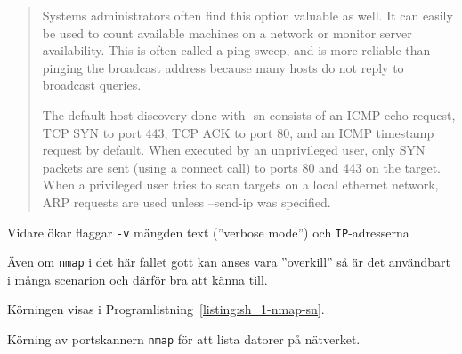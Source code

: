 \begin{quotation}
Systems administrators often find this option valuable as well. It can easily
be used to count available machines on a network or monitor server
availability. This is often called a ping sweep, and is more reliable than
pinging the broadcast address because many hosts do not reply to broadcast
queries.

The default host discovery done with -sn consists of an ICMP echo request, TCP
SYN to port 443, TCP ACK to port 80, and an ICMP timestamp request by default.
When executed by an unprivileged user, only SYN packets are sent (using a
connect call) to ports 80 and 443 on the target. When a privileged user tries
to scan targets on a local ethernet network, ARP requests are used unless
--send-ip was specified. 
\end{quotation}

Vidare ökar flaggar \texttt{-v} mängden text (''verbose mode'') och 
\texttt{IP}-adresserna 


Även om \texttt{nmap} i det här fallet gott kan anses vara ''overkill'' så är
det användbart i många scenarion och därför bra att känna till.

Körningen visas i Programlistning~\ref{listing:sh_1-nmap-sn}.

\begin{listing}[H]
  \caption{Körning av portskannern \texttt{nmap} för att lista datorer på
           nätverket.}
  \label{listing:sh_1-nmap-sn}
\end{listing}
